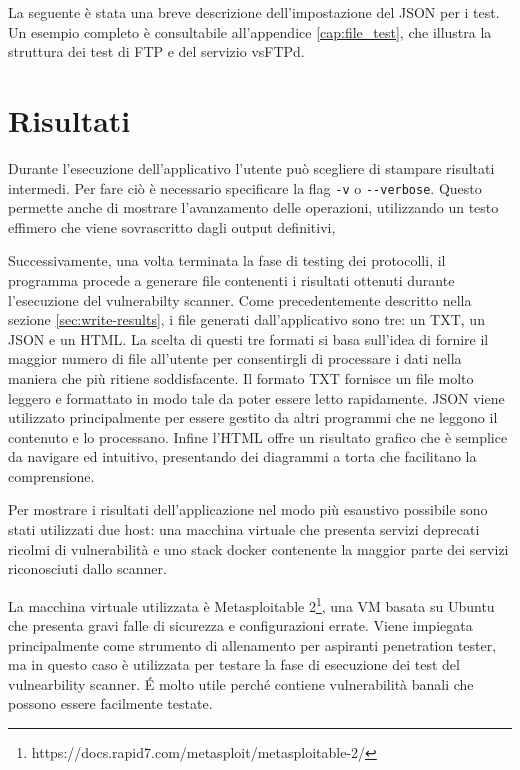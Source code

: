 \documentclass[12pt]{report}
\begin{document}
\noindent
La seguente è stata una breve descrizione dell'impostazione del JSON per i test. Un esempio completo è consultabile all'appendice \ref{cap:file_test}, che illustra la struttura dei test di FTP e del servizio vsFTPd.

% 
% 

\chapter{Risultati}
\label{cap:risultati}

Durante l'esecuzione dell'applicativo l'utente può scegliere di stampare risultati intermedi. Per fare ciò è necessario specificare la flag \lstinline{-v} o \lstinline{--verbose}. Questo permette anche di mostrare l'avanzamento delle operazioni, utilizzando un testo effimero che viene sovrascritto dagli output definitivi, 

Successivamente, una volta terminata la fase di testing dei protocolli, il programma procede a generare file contenenti i risultati ottenuti durante l'esecuzione del vulnerabilty scanner. Come precedentemente descritto nella sezione \ref{sec:write-results}, i file generati dall'applicativo sono tre: un TXT, un JSON e un HTML. La scelta di questi tre formati si basa sull'idea di fornire il maggior numero di file all'utente per consentirgli di processare i dati nella maniera che più ritiene soddisfacente. Il formato TXT fornisce un file molto leggero e formattato in modo tale da poter essere letto rapidamente. JSON viene utilizzato principalmente per essere gestito da altri programmi che ne leggono il contenuto e lo processano. Infine l'HTML offre un risultato grafico che è semplice da navigare ed intuitivo, presentando dei diagrammi a torta che facilitano la comprensione.

Per mostrare i risultati dell'applicazione nel modo più esaustivo possibile sono stati utilizzati due host: una macchina virtuale che presenta servizi deprecati ricolmi di vulnerabilità e uno stack docker contenente la maggior parte dei servizi riconosciuti dallo scanner.

La macchina virtuale utilizzata è Metasploitable 2\footnote{https://docs.rapid7.com/metasploit/metasploitable-2/}, una VM basata su Ubuntu che presenta gravi falle di sicurezza e configurazioni errate. Viene impiegata principalmente come strumento di allenamento per aspiranti penetration tester, ma in questo caso è utilizzata per testare la fase di esecuzione dei test del vulnearbility scanner. \'{E} molto utile perché contiene vulnerabilità banali che possono essere facilmente testate.
\end{document}
